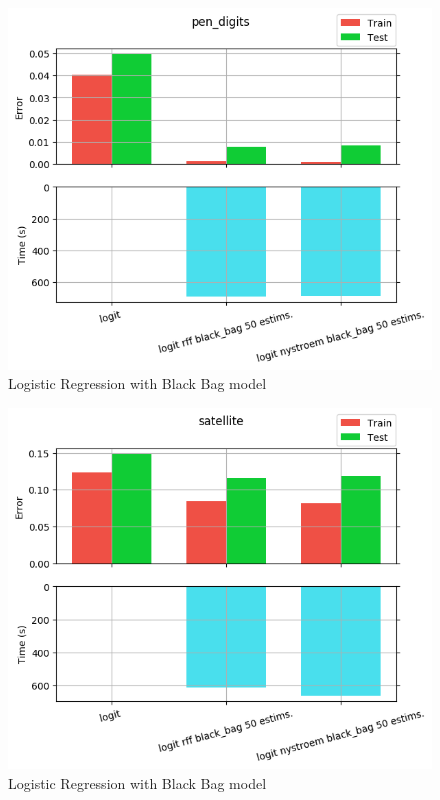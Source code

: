 \begin{figure}[th]
\centering
\includegraphics[scale=\imgscale]{Figures/2_2/pen_digits}
\decoRule
\caption[2.2 pen\tu digits]{Logistic Regression with Black Bag model}
\label{fig:2_2_pen_digits}
\end{figure}

\begin{figure}[th]
\centering
\includegraphics[scale=\imgscale]{Figures/2_2/satellite}
\decoRule
\caption[2.2 satellite]{Logistic Regression with Black Bag model}
\label{fig:2_2_satellite}
\end{figure}

